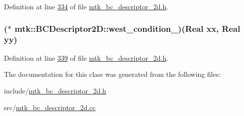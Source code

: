 Definition at line \hyperlink{mtk__bc__descriptor__2d_8h_source_l00334}{334} of file \hyperlink{mtk__bc__descriptor__2d_8h_source}{mtk\+\_\+bc\+\_\+descriptor\+\_\+2d.\+h}.

\hypertarget{classmtk_1_1BCDescriptor2D_a2d4af48b3408658c7ace6eeb74464c9f}{
\subsubsection[{west\+\_\+condition\+\_\+}]{($\ast$ mtk\+::\+B\+C\+Descriptor2\+D\+::west\+\_\+condition\+\_\+)({\bf Real} xx, {\bf Real} yy)\hspace{0.3cm}{\ttfamily [private]}}}\label{classmtk_1_1BCDescriptor2D_a2d4af48b3408658c7ace6eeb74464c9f}


Definition at line \hyperlink{mtk__bc__descriptor__2d_8h_source_l00339}{339} of file \hyperlink{mtk__bc__descriptor__2d_8h_source}{mtk\+\_\+bc\+\_\+descriptor\+\_\+2d.\+h}.



The documentation for this class was generated from the following files\+:\begin{DoxyCompactItemize}
\item 
include/\hyperlink{mtk__bc__descriptor__2d_8h}{mtk\+\_\+bc\+\_\+descriptor\+\_\+2d.\+h}\item 
src/\hyperlink{mtk__bc__descriptor__2d_8cc}{mtk\+\_\+bc\+\_\+descriptor\+\_\+2d.\+cc}\end{DoxyCompactItemize}
